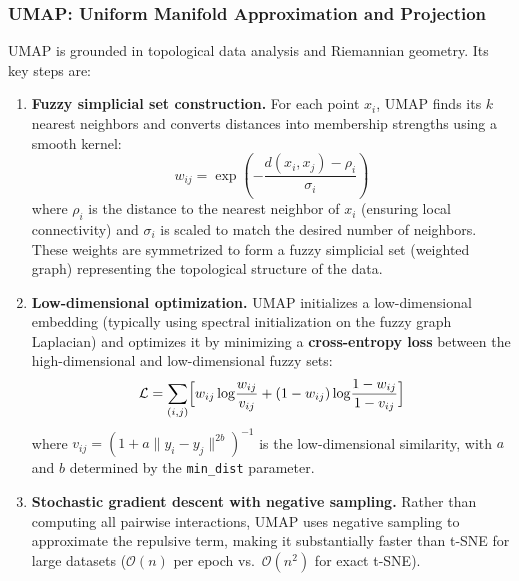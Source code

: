 \subsubsection{UMAP: Uniform Manifold Approximation and Projection}

UMAP is grounded in topological data analysis and Riemannian geometry. Its key
steps are:

\begin{enumerate}[nosep]
  \item \textbf{Fuzzy simplicial set construction.} For each point $x_i$, UMAP
    finds its $k$ nearest neighbors and converts distances into membership
    strengths using a smooth kernel:
    \begin{equation}
      \label{eq:scrnaseq:umap_weight}
      w_{ij} = \exp\!\left(-\frac{d(x_i, x_j) - \rho_i}{\sigma_i}\right)
    \end{equation}
    where $\rho_i$ is the distance to the nearest neighbor of $x_i$ (ensuring
    local connectivity) and $\sigma_i$ is scaled to match the desired number of
    neighbors. These weights are symmetrized to form a fuzzy simplicial set
    (weighted graph) representing the topological structure of the data.
  \item \textbf{Low-dimensional optimization.} UMAP initializes a low-dimensional
    embedding (typically using spectral initialization on the fuzzy graph
    Laplacian) and optimizes it by minimizing a \textbf{cross-entropy loss}
    between the high-dimensional and low-dimensional fuzzy sets:
    \begin{equation}
      \label{eq:scrnaseq:umap_loss}
      \mathcal{L} = \sum_{(i,j)} \Bigl[
        w_{ij} \log\!\frac{w_{ij}}{v_{ij}}
        + (1 - w_{ij}) \log\!\frac{1 - w_{ij}}{1 - v_{ij}}
      \Bigr]
    \end{equation}
    where $v_{ij} = (1 + a \|y_i - y_j\|^{2b})^{-1}$ is the low-dimensional
    similarity, with $a$ and $b$ determined by the \texttt{min\_dist} parameter.
  \item \textbf{Stochastic gradient descent with negative sampling.} Rather than
    computing all pairwise interactions, UMAP uses negative sampling to
    approximate the repulsive term, making it substantially faster than t-SNE
    for large datasets ($\mathcal{O}(n)$ per epoch vs.\ $\mathcal{O}(n^2)$ for
    exact t-SNE).
\end{enumerate}


